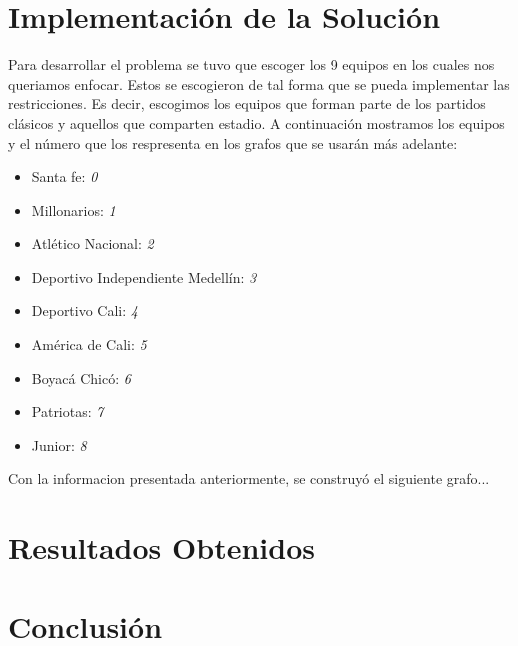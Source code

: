 \documentclass[11pt]{article}
\begin{document}
\begin{multicols}{2}
        \section{Implementación de la Solución}
            Para desarrollar el problema se tuvo que escoger los 9 equipos en los cuales nos queriamos enfocar. Estos se escogieron de tal
            forma que se pueda implementar las restricciones. Es decir, escogimos los equipos que forman parte de los partidos clásicos y aquellos 
            que comparten estadio. A continuación mostramos los equipos y el número que los respresenta en los grafos que se usarán más adelante:
            \begin{itemize}
                \item Santa fe: \textit{0}
                \item Millonarios: \textit{1}
                \item Atlético Nacional: \textit{2}
                \item Deportivo Independiente Medellín: \textit{3}
                \item Deportivo Cali: \textit{4}
                \item América de Cali: \textit{5}
                \item Boyacá Chicó: \textit{6}
                \item Patriotas: \textit{7}
                \item Junior: \textit{8}
            \end{itemize}  
            Con la informacion presentada anteriormente, se construyó el siguiente grafo...   



        \section{Resultados Obtenidos}
        \section{Conclusión}
            
        
        

    \end{multicols}
\end{document}
